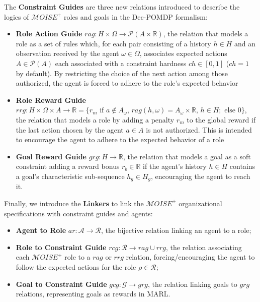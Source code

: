 \documentclass[pdflatex,sn-mathphys-num]{sn-jnl}%
\theoremstyle{thmstyleone}%
\theoremstyle{thmstyletwo}%
\theoremstyle{thmstylethree}%
\begin{document}
\noindent The \textbf{Constraint Guides} are three new relations introduced to describe the logics of $\mathcal{M}OISE^+$ roles and goals in the Dec-POMDP formalism:
%
\begin{itemize}

    \item \textbf{Role Action Guide} \quad $rag: H \times \Omega \rightarrow \mathcal{P}(A \times \mathbb{R})$, the relation that models a role as a set of rules which, for each pair consisting of a history $h \in H$ and an observation received by the agent $\omega \in \Omega$, associates expected actions $A \in \mathcal{P}(A)$ each associated with a constraint hardness $ch \in [0,1]$ ($ch = 1$ by default). By restricting the choice of the next action among those authorized, the agent is forced to adhere to the role's expected behavior
    \item \textbf{Role Reward Guide} \quad $rrg: H \times \Omega \times A \to \mathbb{R} = \{r_m \text{ if } a \notin A_\omega \text{, } rag(h, \omega) \allowbreak = \allowbreak A_\omega \times \mathbb{R} \text{, } h \in H; \text{ else } 0\}$, the relation that models a role by adding a penalty $r_m$ to the global reward if the last action chosen by the agent $a \in A$ is not authorized. This is intended to encourage the agent to adhere to the expected behavior of a role
    \item \textbf{Goal Reward Guide} \quad $grg: H \rightarrow \mathbb{R}$, the relation that models a goal as a soft constraint adding a reward bonus $r_b \in \mathbb{R}$ if the agent's history $h \in H$ contains a goal's characteristic sub-sequence $h_g \in H_g$, encouraging the agent to reach it.
\end{itemize}

\noindent Finally, we introduce the \textbf{Linkers} to link the $\mathcal{M}OISE^+$ organizational specifications with constraint guides and agents:
%
\begin{itemize}

    \item \textbf{Agent to Role} \quad $ar: \mathcal{A} \to \mathcal{R}$, the bijective relation linking an agent to a role;
    \item \textbf{Role to Constraint Guide} \quad $rcg: \mathcal{R} \rightarrow rag \cup rrg$, the relation associating each $\mathcal{M}OISE^+$ role to a $rag$ or $rrg$ relation, forcing/encouraging the agent to follow the expected actions for the role $\rho \in \mathcal{R}$;
    \item \textbf{Goal to Constraint Guide} \quad $gcg: \mathcal{G} \rightarrow grg$, the relation linking goals to $grg$ relations, representing goals as rewards in MARL.
\end{itemize}
\end{document}
